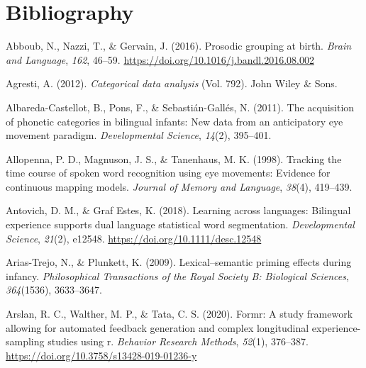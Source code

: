 \documentclass[
  12pt,
  b5paperpaper,
  twoside]{scrreprt}
\newlength{\cslhangindent}
\newlength{\cslentryspacingunit} %
\newenvironment{CSLReferences}[2] %
 {%
  \setlength{\parindent}{0pt}
  \ifodd #1
  \let\oldpar\par
  \def\par{\hangindent=\cslhangindent\oldpar}
  \fi
  \setlength{\parskip}{#2\cslentryspacingunit}
 }%
 {}
\begin{document}
\hypertarget{bibliography}{%
\chapter*{Bibliography}\label{bibliography}}


\begingroup

\hypertarget{refs}{}
\begin{CSLReferences}{1}{0}
\leavevmode{}%
Abboub, N., Nazzi, T., \& Gervain, J. (2016). Prosodic grouping at
birth. \emph{Brain and Language}, \emph{162}, 46--59.
\url{https://doi.org/10.1016/j.bandl.2016.08.002}

\leavevmode{}%
Agresti, A. (2012). \emph{Categorical data analysis} (Vol. 792). John
Wiley \& Sons.

\leavevmode{}%
Albareda-Castellot, B., Pons, F., \& Sebastián-Gallés, N. (2011). The
acquisition of phonetic categories in bilingual infants: New data from
an anticipatory eye movement paradigm. \emph{Developmental Science},
\emph{14}(2), 395--401.

\leavevmode{}%
Allopenna, P. D., Magnuson, J. S., \& Tanenhaus, M. K. (1998). Tracking
the time course of spoken word recognition using eye movements: Evidence
for continuous mapping models. \emph{Journal of Memory and Language},
\emph{38}(4), 419--439.

\leavevmode{}%
Antovich, D. M., \& Graf Estes, K. (2018). Learning across languages:
Bilingual experience supports dual language statistical word
segmentation. \emph{Developmental Science}, \emph{21}(2), e12548.
\url{https://doi.org/10.1111/desc.12548}

\leavevmode{}%
Arias-Trejo, N., \& Plunkett, K. (2009). Lexical--semantic priming
effects during infancy. \emph{Philosophical Transactions of the Royal
Society B: Biological Sciences}, \emph{364}(1536), 3633--3647.

\leavevmode{}%
Arslan, R. C., Walther, M. P., \& Tata, C. S. (2020). Formr: A study
framework allowing for automated feedback generation and complex
longitudinal experience-sampling studies using r. \emph{Behavior
Research Methods}, \emph{52}(1), 376--387.
\url{https://doi.org/10.3758/s13428-019-01236-y}


\end{CSLReferences}
\end{document}
